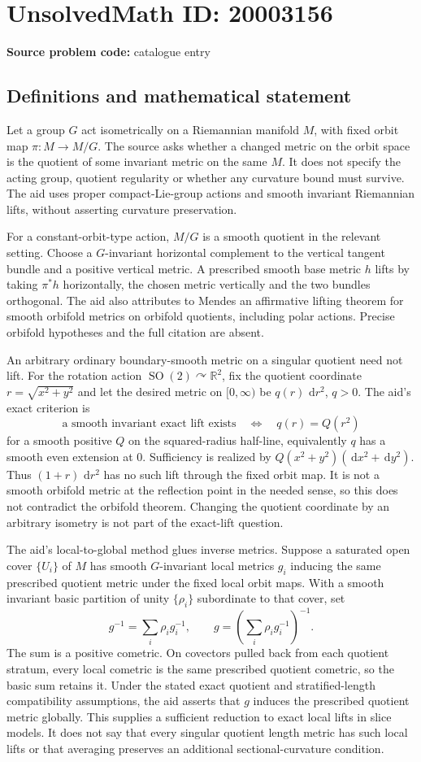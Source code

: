 \documentclass[11pt]{article}
\newcommand{\R}{\mathbb{R}}
\newcommand{\dd}{\,\mathrm{d}}
\begin{document}
\section*{UnsolvedMath ID: 20003156}
\textbf{Source problem code:} catalogue entry
\subsection{Definitions and mathematical statement}
Let a group $G$ act isometrically on a Riemannian manifold $M$, with fixed orbit map $\pi:M\to M/G$. The source asks whether a changed metric on the orbit space is the quotient of some invariant metric on the same $M$. It does not specify the acting group, quotient regularity or whether any curvature bound must survive. The aid uses proper compact-Lie-group actions and smooth invariant Riemannian lifts, without asserting curvature preservation.

For a constant-orbit-type action, $M/G$ is a smooth quotient in the relevant setting. Choose a $G$-invariant horizontal complement to the vertical tangent bundle and a positive vertical metric. A prescribed smooth base metric $h$ lifts by taking $\pi^*h$ horizontally, the chosen metric vertically and the two bundles orthogonal. The aid also attributes to Mendes an affirmative lifting theorem for smooth orbifold metrics on orbifold quotients, including polar actions. Precise orbifold hypotheses and the full citation are absent.

An arbitrary ordinary boundary-smooth metric on a singular quotient need not lift. For the rotation action $\operatorname{SO}(2)\curvearrowright\R^2$, fix the quotient coordinate $r=\sqrt{x^2+y^2}$ and let the desired metric on $[0,\infty)$ be $q(r)\,\dd r^2$, $q>0$. The aid's exact criterion is
\[
\text{a smooth invariant exact lift exists}
\quad\Longleftrightarrow\quad q(r)=Q(r^2)
\]
for a smooth positive $Q$ on the squared-radius half-line, equivalently $q$ has a smooth even extension at $0$. Sufficiency is realized by $Q(x^2+y^2)(\dd x^2+\dd y^2)$. Thus $(1+r)\,\dd r^2$ has no such lift through the fixed orbit map. It is not a smooth orbifold metric at the reflection point in the needed sense, so this does not contradict the orbifold theorem. Changing the quotient coordinate by an arbitrary isometry is not part of the exact-lift question.

The aid's local-to-global method glues inverse metrics. Suppose a saturated open cover $\{U_i\}$ of $M$ has smooth $G$-invariant local metrics $g_i$ inducing the same prescribed quotient metric under the fixed local orbit maps. With a smooth invariant basic partition of unity $\{\rho_i\}$ subordinate to that cover, set
\[
g^{-1}=\sum_i\rho_i g_i^{-1},\qquad
g=\left(\sum_i\rho_i g_i^{-1}\right)^{-1}.
\]
The sum is a positive cometric. On covectors pulled back from each quotient stratum, every local cometric is the same prescribed quotient cometric, so the basic sum retains it. Under the stated exact quotient and stratified-length compatibility assumptions, the aid asserts that $g$ induces the prescribed quotient metric globally. This supplies a sufficient reduction to exact local lifts in slice models. It does not say that every singular quotient length metric has such local lifts or that averaging preserves an additional sectional-curvature condition.
\end{document}
